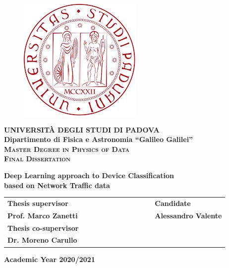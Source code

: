 \begin{titlepage}
\vspace{5mm}
\begin{figure}[hbtp]
\centering
\includegraphics[scale=.43]{images/UNIPD.png}
\end{figure}
\vspace{5mm}
\begin{center}
{{\huge{\textsc{\bf UNIVERSIT\`A DEGLI STUDI DI PADOVA}}}\\}
\vspace{5mm}
{\Large{\bf Dipartimento di Fisica e Astronomia ``Galileo Galilei''}} \\
\vspace{5mm}
{\Large{\textsc{\bf Master Degree in Physics of Data}}}\\
\vspace{15mm}
{\Large{\textsc{\bf Final Dissertation}}}\\
\vspace{18mm}
\begin{spacing}{3}
{\LARGE \textbf{Deep Learning approach to Device Classification\\ based on Network Traffic data }}\\
\end{spacing}
\vspace{8mm}
\end{center}

\vspace{20mm}
\begin{spacing}{2}
\begin{tabular}{ l  c  c c c  cc c c c c  l }
{\Large{\bf Thesis supervisor}} &&&&&&&&&&& {\Large{\bf Candidate}}\\
{\Large{\bf Prof. Marco Zanetti}} &&&&&&&&&&& {\Large{\bf Alessandro Valente}}\\
{\Large{\bf Thesis co-supervisor}}\\
{\Large{\bf Dr. Moreno Carullo}}\\
\end{tabular}
\end{spacing}
\vspace{15 mm}

\begin{center}
{\Large{\bf Academic Year 2020/2021}}
\end{center}
\end{titlepage}







